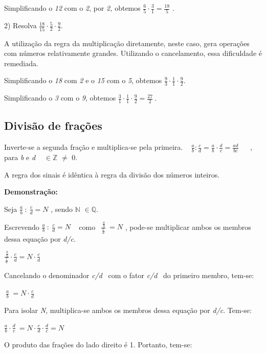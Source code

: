 Simplificando o \textit{12} com o \textit{2}, por \textit{2,} obtemos   \( \frac{6}{5} \cdot \frac{3}{1}=\frac{18}{5} \) { .}

2) Resolva \( \frac{18}{15} \cdot \frac{5}{2} \cdot \frac{9}{2}\text{.} \)

A utilização da regra da multiplicação diretamente, neste caso, gera operações com números relativamente grandes. Utilizando o cancelamento, essa dificuldade é remediada.

Simplificando o \textit{18} com \textit{2} e o \textit{15} com o \textit{5}, obtemos  \( \frac{9}{3} \cdot \frac{1}{1} \cdot \frac{9}{2}. \) 

Simplificando o \textit{3} com o \textit{9}, obtemos  \( \frac{3}{1} \cdot \frac{1}{1} \cdot \frac{9}{2}=\frac{27}{2}~. \) \quad 

\subsection{Divisão de frações}

\begin{caixa}
\quad Inverte-se a segunda fração e multiplica-se pela primeira.
~ \quad \quad  \( \frac{a}{b}:\frac{c}{d}=\frac{a}{b} \cdot \frac{d}{c}=\frac{ad}{bc}~~ \) ~ , para \textit{b} e \textit{d} \textit{~  \( \in \mathbb{Z} \) }  $ \neq $   0.
\end{caixa}
A regra dos sinais é idêntica à regra da divisão dos números inteiros.

\textbf{Demonstração: }

Seja \( \frac{a}{b}~:~\frac{c}{d}=N \) , sendo $\mathbb{N}$  \( \in \mathbb{Q} \).

Escrevendo \( \frac{a}{b}~:~\frac{c}{d}=N \) ~ como  \( ~~\frac{~\frac{a}{b}}{\frac{c}{d}}~ =N \)  , pode-se multiplicar ambos os membros dessa equação por \textit{d/c}.

\quad  \(\frac{~\frac{a}{b}}{\frac{c}{d}}  \cdot  \frac{c}{d} =N  \cdot  \frac{c}{d} \) 

Cancelando o denominador \textit{c/d}~ com o fator \textit{c/d}~ do primeiro membro, tem-se:

\quad  \( ~\frac{a}{b}~ =N  \cdot  \frac{c}{d} \) 

Para isolar \textit{N}, multiplica-se ambos os membros dessa equação por \textit{d/c}. Tem-se:

\quad  \( \frac{a}{b} \cdot  \frac{d}{c}~ =N  \cdot  \frac{c}{d} \cdot  \frac{d}{c}=N \) 

O produto das frações do lado direito é 1. Portanto, tem-se:

